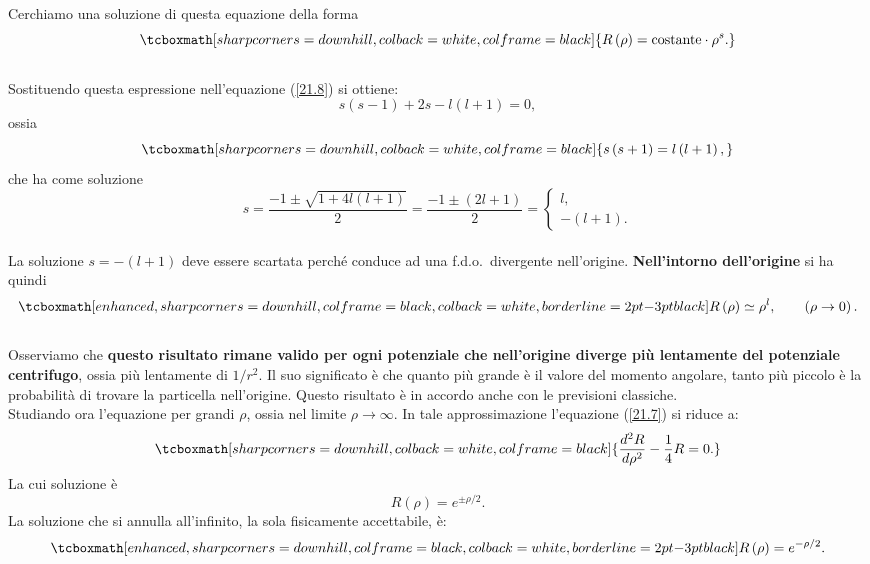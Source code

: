 \documentclass[a4paper,12pt,oneside]{book}
\begin{document}
Cerchiamo una soluzione di questa equazione della forma
	\begin{equation}
		\tcboxmath[sharp corners=downhill, colback=white, colframe=black]{
			R\left(\rho\right)=\mbox{costante}\cdot \rho^s .
			}
	\end{equation}\\

Sostituendo questa espressione nell'equazione (\ref{21.8}) si ottiene:
	\begin{equation}
		s\left(s-1\right)+2s-l\left(l+1\right)=0 ,
	\end{equation}
ossia
	\begin{equation}
		\tcboxmath[sharp corners=downhill, colback=white, colframe=black]{
		s\left(s+1\right)=l\left(l+1\right) ,
		}
	\end{equation}
che ha come soluzione
\begin{equation}
s=\frac{-1\pm\sqrt{1+4l\left(l+1\right)}}{2}=\frac{-1\pm\left(2l+1\right)}{2}=\begin{cases}l, \\-\left(l+1\right) . \end{cases}
\end{equation}\\

La soluzione $s=-\left(l+1\right)$ deve essere scartata perché  conduce ad una f.d.o.~divergente nell'origine. \textbf{Nell'intorno dell'origine} si ha quindi
	\begin{equation}
		\tcboxmath[enhanced, sharp corners=downhill, colframe=black, colback=white, borderline={2pt}{-3pt}{black}]{
			R\left(\rho\right)\simeq\rho^l ,
			} \qquad \left(\rho\rightarrow0\right) .
	\end{equation}\\

Osserviamo che \textbf{questo risultato rimane valido per ogni potenziale che nell'origine diverge più lentamente del potenziale centrifugo}, ossia più lentamente di $1/r^2$. Il suo significato è che quanto più grande è il valore del momento angolare, tanto più piccolo è la probabilità di trovare la particella nell'origine.
Questo risultato è in accordo anche con le previsioni classiche.\\

Studiando ora l'equazione per grandi $\rho$, ossia nel limite \textbf{$\rho\rightarrow\infty$}. In tale approssimazione l'equazione (\ref{21.7}) si riduce a:
	\begin{equation}
		\tcboxmath[sharp corners=downhill, colback=white, colframe=black]{
			\frac{d^2R}{d\rho^2}-\frac{1}{4}R=0 .
			}
	\end{equation}
La cui soluzione è
	\begin{equation}
		R\left(\rho\right)=e^{\pm\rho/2} . 
	\end{equation}
La soluzione che si annulla all'infinito, la sola fisicamente accettabile, è:
	\begin{equation}
		\tcboxmath[enhanced, sharp corners=downhill, colframe=black, colback=white, borderline={2pt}{-3pt}{black}]{
			R\left(\rho\right)=e^{-\rho/2} .
			}
	\end{equation}\\
	
\end{document}
